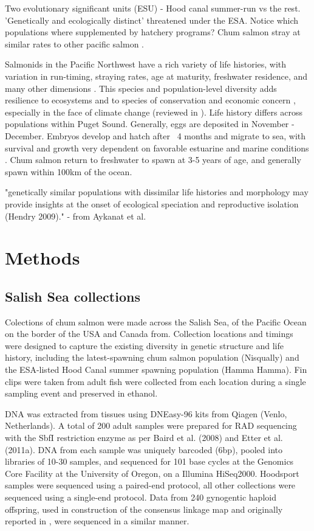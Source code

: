 \documentclass[12pt, one column]{article}
\begin{document}
Two evolutionary significant units (ESU) - Hood canal summer-run vs the rest. 'Genetically and ecologically distinct' threatened under the ESA. Notice which populations where supplemented by hatchery programs?
Chum salmon stray at similar rates to other pacific salmon \cite{Small2014}.

Salmonids in the Pacific Northwest have a rich variety of life histories, with variation in run-timing, straying rates, age at maturity, freshwater residence, and many other dimensions \citep{Quinn2005}. This species and population-level diversity adds resilience to ecosystems and to species of conservation and economic concern \citep{Schindler2010}, especially in the face of climate change (reviewed in \citet{Schindler2015}).  Life history differs across populations within Puget Sound.  Generally, eggs are deposited in November - December. Embryos develop and hatch after ~4 months and migrate to sea, with survival and growth very dependent on favorable estuarine and marine conditions  \citep{Quinn2005}.  Chum salmon return to freshwater to spawn at 3-5 years of age, and generally spawn within 100km of the ocean.


"genetically similar populations with dissimilar life histories and morphology may provide insights at the onset of ecological speciation and reproductive isolation (Hendry 2009)." - from Aykanat et al.


\section*{Methods}

\subsection*{Salish Sea collections}
Colections of chum salmon were made across the Salish Sea, of the Pacific Ocean on the border of the USA and Canada from. Collection locations and timings were designed to capture the existing diversity in genetic structure and life history, including the latest-spawning chum salmon population (Nisqually) and the ESA-listed Hood Canal summer spawning population (Hamma Hamma).  Fin clips were taken from adult fish were collected from each location during a single sampling event and preserved in ethanol.  

DNA was extracted from tissues using DNEasy-96 kits from Qiagen (Venlo, Netherlands). A total of 200 adult samples were prepared for RAD sequencing with the SbfI restriction enzyme as per Baird et al. (2008) and Etter et al. (2011a). DNA from each sample was uniquely barcoded (6bp), pooled into libraries of 10-30 samples, and sequenced for 101 base cycles at the Genomics Core Facility at the University of Oregon, on a Illumina HiSeq2000. Hoodsport samples were sequenced using a paired-end protocol, all other collections were sequenced using a single-end protocol.  Data from 240 gynogentic haploid offspring, used in construction of the consensus linkage map and originally reported in \citet{Waples2015}, were sequenced in a similar manner.  
\end{document}
